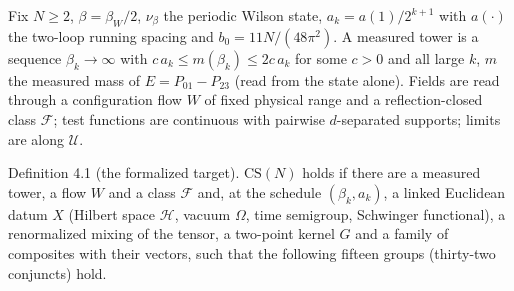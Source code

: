 \documentclass[10pt,letterpaper,twocolumn]{article}
\begin{document}
Fix \(N\ge2\), \(\beta=\beta_W/2\), \(\nu_\beta\) the periodic Wilson state, \(a_k=a(1)/2^{k+1}\) with \(a(\cdot)\) the two-loop running spacing and \(b_0=11N/(48\pi^2)\). A measured tower is a sequence \(\beta_k\to\infty\) with \(c\,a_k\le m(\beta_k)\le2c\,a_k\) for some \(c>0\) and all large \(k\), \(m\) the measured mass of \(E=P_{01}-P_{23}\) (read from the state alone). Fields are read through a configuration flow \(W\) of fixed physical range and a reflection-closed class \(\mathcal F\); test functions are continuous with pairwise \(d\)-separated supports; limits are along \(\mathcal U\).

Definition 4.1 (the formalized target). \(\mathrm{CS}(N)\) holds if there are a measured tower, a flow \(W\) and a class \(\mathcal F\) and, at the schedule \((\beta_k,a_k)\), a linked Euclidean datum \(X\) (Hilbert space \(\mathcal H\), vacuum \(\Omega\), time semigroup, Schwinger functional), a renormalized mixing of the tensor, a two-point kernel \(G\) and a family of composites with their vectors, such that the following fifteen groups (thirty-two conjuncts) hold.
\end{document}
